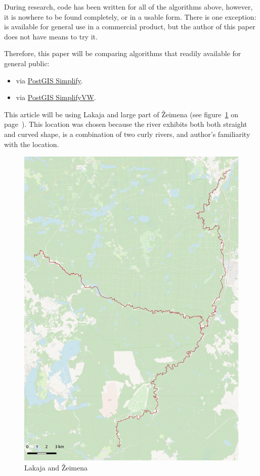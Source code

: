 \documentclass[a4paper]{article}
\begin{document}
During research, code has been written for all of the algorithms above,
however, it is nowhere to be found completely, or in a usable form. There is
one exception: \cite{wang1998line} is available for general use in a commercial
product, but the author of this paper does not have means to try it.

Therefore, this paper will be comparing algorithms that readily available for
general public:
\begin{itemize}
    \item \cite{douglas1973algorithms} via
        \href{https://postgis.net/docs/ST_Simplify.html}{PostGIS Simplify}.

    \item \cite{visvalingam1993line} via
        \href{https://postgis.net/docs/ST_SimplifyVW.html}{PostGIS SimplifyVW}.
\end{itemize}

This article will be using Lakaja and large part of Žeimena (see
figure~\ref{fig:zeimena} on page~\pageref{fig:zeimena}). This location was
chosen because the river exhibits both both straight and curved shape, is a
combination of two curly rivers, and author's familiarity with the location.

\begin{figure}[H]
    \centering
    \includegraphics[width=148mm]{zeimena-pretty}
    \caption{Lakaja and Žeimena}
    \label{fig:zeimena}
\end{figure}
\end{document}
